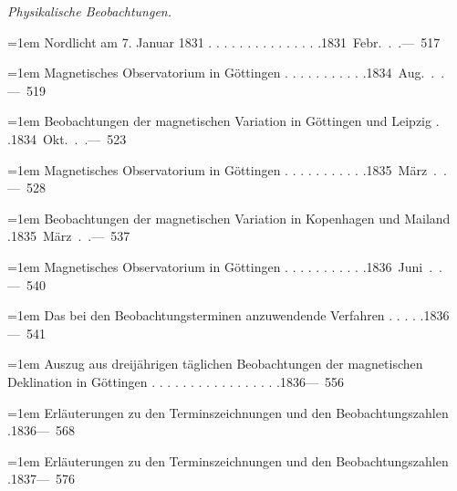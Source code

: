 \par{}\medskip\noindent\textit{Physikalische Beobachtungen.}\par\smallskip
\noindent\hangindent=1em Nordlicht am 7. Januar 1831 . . . . . . . . . . . . . . .\unskip\hspace{1em plus 1fill}\mbox{1831 Febr. . .\quad — 517}\par\smallskip
\noindent\hangindent=1em Magnetisches Observatorium in Göttingen . . . . . . . . . . .\unskip\hspace{1em plus 1fill}\mbox{1834 Aug. . .\quad — 519}\par\smallskip
\noindent\hangindent=1em Beobachtungen der magnetischen Variation in Göttingen und Leipzig . .\unskip\hspace{1em plus 1fill}\mbox{1834 Okt. . .\quad — 523}\par\smallskip
\noindent\hangindent=1em Magnetisches Observatorium in Göttingen . . . . . . . . . . .\unskip\hspace{1em plus 1fill}\mbox{1835 März . .\quad — 528}\par\smallskip
\noindent\hangindent=1em Beobachtungen der magnetischen Variation in Kopenhagen und Mailand .\unskip\hspace{1em plus 1fill}\mbox{1835 März . .\quad — 537}\par\smallskip
\noindent\hangindent=1em Magnetisches Observatorium in Göttingen . . . . . . . . . . .\unskip\hspace{1em plus 1fill}\mbox{1836 Juni . .\quad — 540}\par\smallskip
\noindent\hangindent=1em Das bei den Beobachtungsterminen anzuwendende Verfahren . . . . .\unskip\hspace{1em plus 1fill}\mbox{1836\quad — 541}\par\smallskip
\noindent\hangindent=1em Auszug aus dreijährigen täglichen Beobachtungen der magnetischen Deklination in Göttingen . . . . . . . . . . . . . . . . .\unskip\hspace{1em plus 1fill}\mbox{1836\quad — 556}\par\smallskip
\noindent\hangindent=1em Erläuterungen zu den Terminszeichnungen und den Beobachtungszahlen .\unskip\hspace{1em plus 1fill}\mbox{1836\quad — 568}\par\smallskip
\noindent\hangindent=1em Erläuterungen zu den Terminszeichnungen und den Beobachtungszahlen .\unskip\hspace{1em plus 1fill}\mbox{1837\quad — 576}\par\smallskip
